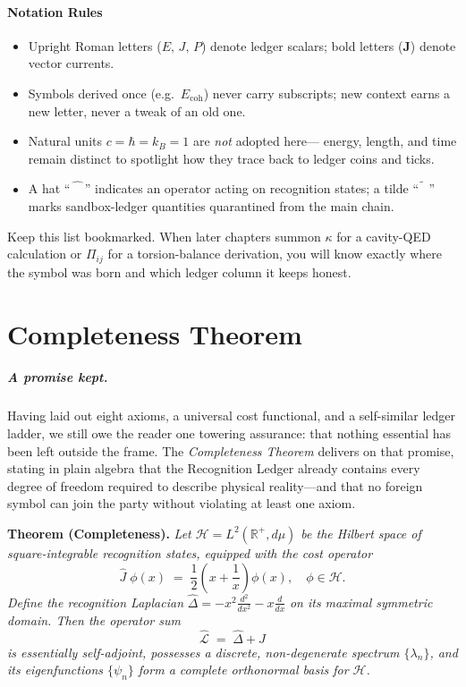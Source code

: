 \documentclass[11pt,oneside]{book}
\newcommand{\Eoh}{\ensuremath{E_{\text{coh}}}}       %
\begin{document}
\subsubsection*{Notation Rules}
\begin{itemize}
\item Upright Roman letters (\(E,\,J,\,P\)) denote ledger scalars; bold
  letters (\(\mathbf J\)) denote vector currents.
\item Symbols derived once (e.g.\ \(\Eoh\)) never carry subscripts; new
  context earns a new letter, never a tweak of an old one.
\item Natural units \(c=\hbar=k_B=1\) are \emph{not} adopted here—
  energy, length, and time remain distinct to spotlight how they trace
  back to ledger coins and ticks.
\item A hat “\,\(\widehat{\phantom X}\)\,” indicates an operator acting
  on recognition states; a tilde “\(\widetilde{\phantom X}\)” marks
  sandbox-ledger quantities quarantined from the main chain.
\end{itemize}

Keep this list bookmarked.  
When later chapters summon \(\kappa\) for a cavity-QED calculation or
\(\Pi_{ij}\) for a torsion-balance derivation, you will know exactly
where the symbol was born and which ledger column it keeps honest.

\chapter{Completeness Theorem}
\label{ssec:completeness-theorem}

\paragraph*{A promise kept.}
Having laid out eight axioms, a universal cost functional, and a
self-similar ledger ladder, we still owe the reader one towering
assurance: that nothing essential has been left outside the frame.
The \emph{Completeness Theorem} delivers on that promise, stating in
plain algebra that the Recognition Ledger already contains every degree
of freedom required to describe physical reality—and that no foreign
symbol can join the party without violating at least one axiom.

\medskip
\noindent\textbf{Theorem (Completeness).}\;
\emph{Let
\(\mathcal H = L^{2}(\mathbb R^{+},d\mu)\)
be the Hilbert space of square-integrable recognition states, equipped
with the cost operator}
\[
  \widehat J\;\phi(x)
  \;=\;
  \frac12\!\left(x+\frac1x\right)\phi(x),
  \quad\phi\in\mathcal H.
\]
\emph{Define the recognition Laplacian}
\(
  \widehat{\Delta}
  = -x^{2}\tfrac{d^{2}}{dx^{2}} - x\tfrac{d}{dx}
\)
\emph{on its maximal symmetric domain.  Then the operator sum}
\[
  \widehat{\mathcal L}
  \;=\;
  \widehat{\Delta} + \widehat{J}
\]
\emph{is essentially self-adjoint, possesses a discrete, non-degenerate
spectrum \(\{\lambda_{n}\}\), and its eigenfunctions
\(\{\psi_{n}\}\) form a complete orthonormal basis for \(\mathcal H\).}
\end{document}
